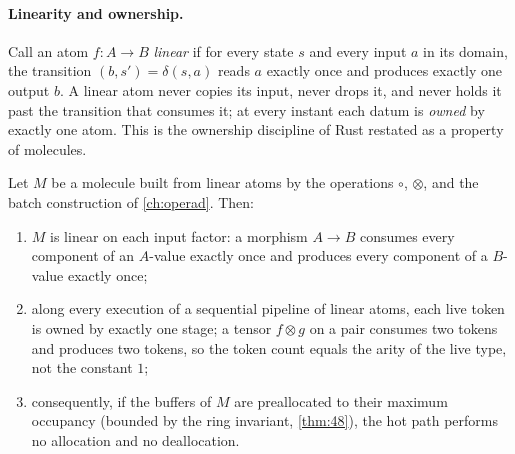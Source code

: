 \paragraph{Linearity and ownership.}
Call an atom $f : A \to B$ \emph{linear} if for every state $s$ and every input $a$ in its domain, the transition $(b, s') = \delta (s, a)$ reads $a$ exactly once and produces exactly one output $b$. A linear atom never copies its input, never drops it, and never holds it past the transition that consumes it; at every instant each datum is \emph{owned} by exactly one atom. This is the ownership discipline of Rust restated as a property of molecules.

\begin{theorem}\label{thm:50}
Let $M$ be a molecule built from linear atoms by the operations $\circ$, $\otimes$, and the batch construction of \autoref{ch:operad}. Then:
\begin{enumerate}
\item $M$ is linear on each input factor: a morphism $A \to B$ consumes every component of an $A$-value exactly once and produces every component of a $B$-value exactly once;
\item along every execution of a sequential pipeline of linear atoms, each live token is owned by exactly one stage; a tensor $f \otimes g$ on a pair consumes two tokens and produces two tokens, so the token count equals the arity of the live type, not the constant $1$;
\item consequently, if the buffers of $M$ are preallocated to their maximum occupancy (bounded by the ring invariant, \autoref{thm:48}), the hot path performs no allocation and no deallocation.
\end{enumerate}
\end{theorem}

